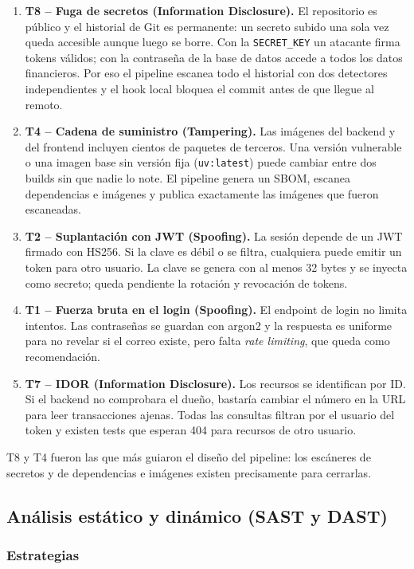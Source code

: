 \begin{enumerate}
    \item \textbf{T8 -- Fuga de secretos (Information Disclosure).} El repositorio es público y el historial de Git es permanente: un secreto subido una sola vez queda accesible aunque luego se borre. Con la \texttt{SECRET\_KEY} un atacante firma tokens válidos; con la contraseña de la base de datos accede a todos los datos financieros. Por eso el pipeline escanea todo el historial con dos detectores independientes y el hook local bloquea el commit antes de que llegue al remoto.
    \item \textbf{T4 -- Cadena de suministro (Tampering).} Las imágenes del backend y del frontend incluyen cientos de paquetes de terceros. Una versión vulnerable o una imagen base sin versión fija (\texttt{uv:latest}) puede cambiar entre dos builds sin que nadie lo note. El pipeline genera un SBOM, escanea dependencias e imágenes y publica exactamente las imágenes que fueron escaneadas.
    \item \textbf{T2 -- Suplantación con JWT (Spoofing).} La sesión depende de un JWT firmado con HS256. Si la clave es débil o se filtra, cualquiera puede emitir un token para otro usuario. La clave se genera con al menos 32 bytes y se inyecta como secreto; queda pendiente la rotación y revocación de tokens.
    \item \textbf{T1 -- Fuerza bruta en el login (Spoofing).} El endpoint de login no limita intentos. Las contraseñas se guardan con argon2 y la respuesta es uniforme para no revelar si el correo existe, pero falta \textit{rate limiting}, que queda como recomendación.
    \item \textbf{T7 -- IDOR (Information Disclosure).} Los recursos se identifican por ID. Si el backend no comprobara el dueño, bastaría cambiar el número en la URL para leer transacciones ajenas. Todas las consultas filtran por el usuario del token y existen tests que esperan 404 para recursos de otro usuario.
\end{enumerate}

T8 y T4 fueron las que más guiaron el diseño del pipeline: los escáneres de secretos y de dependencias e imágenes existen precisamente para cerrarlas.

\subsection{Análisis estático y dinámico (SAST y DAST)}

\subsubsection{Estrategias}

